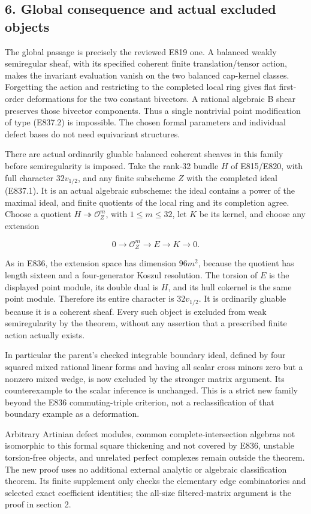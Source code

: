 \subsection{6. Global consequence and actual excluded
objects}\label{global-consequence-and-actual-excluded-objects}

The global passage is precisely the reviewed E819 one. A balanced weakly
semiregular sheaf, with its specified coherent finite translation/tensor
action, makes the invariant evaluation vanish on the two balanced
cap-kernel classes. Forgetting the action and restricting to the
completed local ring gives flat first-order deformations for the two
constant bivectors. A rational algebraic B shear preserves those
bivector components. Thus a single nontrivial point modification of type
(E837.2) is impossible. The chosen formal parameters and individual
defect bases do not need equivariant structures.

There are actual ordinarily gluable balanced coherent sheaves in this
family before semiregularity is imposed. Take the rank-32 bundle \(H\)
of E815/E820, with full character \(32v_{1/2}\), and any finite
subscheme \(Z\) with the completed ideal (E837.1). It is an actual
algebraic subscheme: the ideal contains a power of the maximal ideal,
and finite quotients of the local ring and its completion agree. Choose
a quotient \(H\twoheadrightarrow\mathcal O_Z^m\), with \(1\le m\le32\),
let \(K\) be its kernel, and choose any extension

\[
 0\longrightarrow\mathcal O_Z^m\longrightarrow E\longrightarrow K
       \longrightarrow0.
 \tag{E837.17}
\]

As in E836, the extension space has dimension \(96m^2\), because the
quotient has length sixteen and a four-generator Koszul resolution. The
torsion of \(E\) is the displayed point module, its double dual is
\(H\), and its hull cokernel is the same point module. Therefore its
entire character is \(32v_{1/2}\). It is ordinarily gluable because it
is a coherent sheaf. Every such object is excluded from weak
semiregularity by the theorem, without any assertion that a prescribed
finite action actually exists.

In particular the parent's checked integrable boundary ideal, defined by
four squared mixed rational linear forms and having all scalar cross
minors zero but a nonzero mixed wedge, is now excluded by the stronger
matrix argument. Its counterexample to the scalar inference is
unchanged. This is a strict new family beyond the E836 commuting-triple
criterion, not a reclassification of that boundary example as a
deformation.

Arbitrary Artinian defect modules, common complete-intersection algebras
not isomorphic to this formal square thickening and not covered by E836,
unstable torsion-free objects, and unrelated perfect complexes remain
outside the theorem. The new proof uses no additional external analytic
or algebraic classification theorem. Its finite supplement only checks
the elementary edge combinatorics and selected exact coefficient
identities; the all-size filtered-matrix argument is the proof in
section 2.

